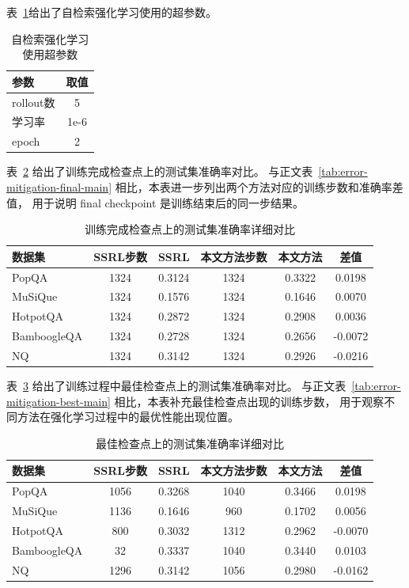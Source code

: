 表~\ref{tab:ssrl-config}给出了自检索强化学习使用的超参数。

\begin{table}[htbp]
\caption{自检索强化学习使用超参数}
\label{tab:ssrl-config}
\vspace{0.5em}\centering\wuhao
\begin{tabular}{lc}
\toprule
参数 & 取值 \\
\midrule
rollout数 & 5 \\
学习率 & 1e-6 \\
epoch & 2 \\
\bottomrule
\end{tabular}
\end{table}

表~\ref{tab:appendix-error-mitigation-final} 给出了训练完成检查点上的测试集准确率对比。
与正文表~\ref{tab:error-mitigation-final-main} 相比，本表进一步列出两个方法对应的训练步数和准确率差值，
用于说明 final checkpoint 是训练结束后的同一步结果。

\begin{table}[htbp]
\caption{训练完成检查点上的测试集准确率详细对比}
\label{tab:appendix-error-mitigation-final}
\vspace{0.5em}\centering\wuhao
\begin{tabular}{lccccc}
\toprule
数据集 & SSRL步数 & SSRL & 本文方法步数 & 本文方法 & 差值 \\
\midrule
PopQA & 1324 & 0.3124 & 1324 & 0.3322 & 0.0198 \\
MuSiQue & 1324 & 0.1576 & 1324 & 0.1646 & 0.0070 \\
HotpotQA & 1324 & 0.2872 & 1324 & 0.2908 & 0.0036 \\
BamboogleQA & 1324 & 0.2728 & 1324 & 0.2656 & -0.0072 \\
NQ & 1324 & 0.3142 & 1324 & 0.2926 & -0.0216 \\
\bottomrule
\end{tabular}
\end{table}

表~\ref{tab:appendix-error-mitigation-best} 给出了训练过程中最佳检查点上的测试集准确率对比。
与正文表~\ref{tab:error-mitigation-best-main} 相比，本表补充最佳检查点出现的训练步数，
用于观察不同方法在强化学习过程中的最优性能出现位置。

\begin{table}[htbp]
\caption{最佳检查点上的测试集准确率详细对比}
\label{tab:appendix-error-mitigation-best}
\vspace{0.5em}\centering\wuhao
\begin{tabular}{lccccc}
\toprule
数据集 & SSRL步数 & SSRL & 本文方法步数 & 本文方法 & 差值 \\
\midrule
PopQA & 1056 & 0.3268 & 1040 & 0.3466 & 0.0198 \\
MuSiQue & 1136 & 0.1646 & 960 & 0.1702 & 0.0056 \\
HotpotQA & 800 & 0.3032 & 1312 & 0.2962 & -0.0070 \\
BamboogleQA & 32 & 0.3337 & 1040 & 0.3440 & 0.0103 \\
NQ & 1296 & 0.3142 & 1056 & 0.2980 & -0.0162 \\
\bottomrule
\end{tabular}
\end{table}

